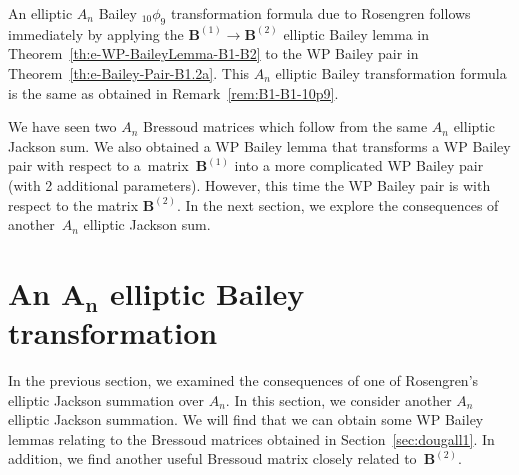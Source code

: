 \documentclass[pdftex]{sigma}
\numberwithin{equation}{section}
\newcommand{\B}{{ \mathbf B}}
\begin{document}
An elliptic $A_n$ Bailey $_{10}\phi_9$ transformation formula due to Rosengren \cite[Corollary~8.1]{HR2004} follows immediately by applying the $\B^{(1)}\to\B^{(2)}$ elliptic Bailey lemma in Theorem~\ref{th:e-WP-BaileyLemma-B1-B2} to the WP Bailey pair in Theorem~\ref{th:e-Bailey-Pair-B1.2a}. This $A_n$ elliptic Bailey transformation formula is the same as obtained in Remark~\ref{rem:B1-B1-10p9}.

We have seen two $A_n$ Bressoud matrices which follow from the same $A_n$ elliptic Jackson sum. We also obtained a WP Bailey lemma that transforms a WP Bailey pair with respect to a~mat\-rix~$\B^{(1)}$ into a more complicated WP Bailey pair (with 2 additional parameters). However, this time the WP Bailey pair is with respect to the matrix $\B^{(2)}$. In the next section, we explore the consequences of another~$A_n$ elliptic Jackson sum.

\section[An $A_n$ elliptic Bailey transformation]{An $\boldsymbol{A_n}$ elliptic Bailey transformation}\label{sec:dougall5}

In the previous section, we examined the consequences of one of Rosengren's elliptic Jackson summation over $A_n$. In this section, we consider another $A_n$ elliptic Jackson summation. We will find that we can obtain some WP Bailey lemmas relating to the Bressoud matrices obtained in
Section~\ref{sec:dougall1}. In addition, we find another useful Bressoud matrix closely related to~$\B^{(2)}$.
\end{document}
